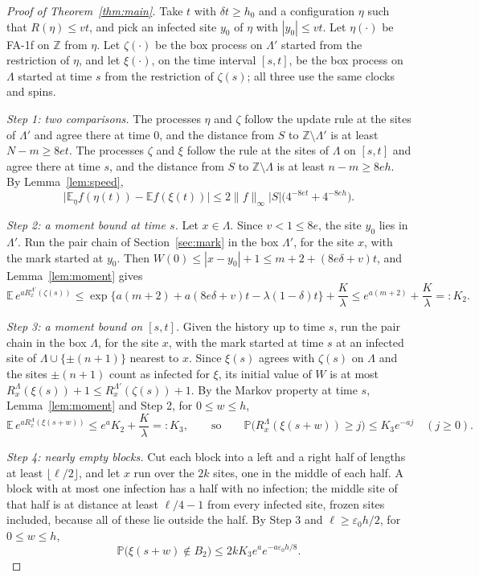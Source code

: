 \documentclass[11pt]{amsart}
\theoremstyle{definition}
\theoremstyle{remark}
\newcommand{\PP}{\mathbb{P}}
\newcommand{\E}{\mathbb{E}}
\newcommand{\Z}{\mathbb{Z}}
\begin{document}
\begin{proof}[Proof of Theorem~\ref{thm:main}]
Take $t$ with $\delta t\ge h_0$ and a configuration $\eta$ such that $R(\eta)\le vt$, and pick an infected site $y_0$
of $\eta$ with $|y_0|\le vt$. Let $\eta(\cdot)$ be FA-1f on $\Z$ from $\eta$. Let $\zeta(\cdot)$ be the box process on
$\Lambda'$ started from the restriction of $\eta$, and let $\xi(\cdot)$, on the time interval $[s,t]$, be the box process
on $\Lambda$ started at time $s$ from the restriction of $\zeta(s)$; all three use the same clocks and spins.

\emph{Step 1: two comparisons.} The processes $\eta$ and $\zeta$ follow the update rule at the sites of $\Lambda'$ and
agree there at time $0$, and the distance from $S$ to $\Z\setminus\Lambda'$ is at least $N-m\ge8et$. The processes
$\zeta$ and $\xi$ follow the rule at the sites of $\Lambda$ on $[s,t]$ and agree there at time $s$, and the distance from
$S$ to $\Z\setminus\Lambda$ is at least $n-m\ge8eh$. By Lemma~\ref{lem:speed},
\begin{equation}\label{eq:step1}
\bigl|\E_\eta f(\eta(t))-\E f(\xi(t))\bigr|\le2\|f\|_\infty|S|\bigl(4^{-8et}+4^{-8eh}\bigr).
\end{equation}

\emph{Step 2: a moment bound at time $s$.} Let $x\in\Lambda$. Since $v<1\le8e$, the site $y_0$ lies in $\Lambda'$. Run the
pair chain of Section~\ref{sec:mark} in the box $\Lambda'$, for the site $x$, with the mark started at $y_0$. Then
$W(0)\le|x-y_0|+1\le m+2+(8e\delta+v)t$, and Lemma~\ref{lem:moment} gives
\[
\E\,e^{aR^{\Lambda'}_x(\zeta(s))}\le\exp\bigl\{a(m+2)+a(8e\delta+v)t-\lambda(1-\delta)t\bigr\}+\frac K\lambda
\le e^{a(m+2)}+\frac K\lambda=:K_2 .
\]

\emph{Step 3: a moment bound on $[s,t]$.} Given the history up to time $s$, run the pair chain in the box $\Lambda$, for
the site $x$, with the mark started at time $s$ at an infected site of $\Lambda\cup\{\pm(n+1)\}$ nearest to $x$. Since
$\xi(s)$ agrees with $\zeta(s)$ on $\Lambda$ and the sites $\pm(n+1)$ count as infected for $\xi$, its initial value of
$W$ is at most $R^\Lambda_x(\xi(s))+1\le R^{\Lambda'}_x(\zeta(s))+1$. By the Markov property at time $s$, Lemma~\ref{lem:moment}
and Step 2, for $0\le w\le h$,
\[
\E\,e^{aR^\Lambda_x(\xi(s+w))}\le e^aK_2+\frac K\lambda=:K_3,\qquad\text{so}\qquad
\PP\bigl(R^\Lambda_x(\xi(s+w))\ge j\bigr)\le K_3e^{-aj}\quad(j\ge0).
\]

\emph{Step 4: nearly empty blocks.} Cut each block into a left and a right half of lengths at least $\lfloor\ell/2\rfloor$,
and let $x$ run over the $2k$ sites, one in the middle of each half. A block with at most one infection has a half with no infection;
the middle site of that half is at distance at least $\ell/4-1$ from every infected site, frozen sites included, because all of
these lie outside the half. By Step 3 and $\ell\ge\varepsilon_0h/2$, for $0\le w\le h$,
\[
\PP\bigl(\xi(s+w)\notin B_2\bigr)\le2kK_3e^{a}e^{-a\varepsilon_0h/8}.
\]


\end{proof}
\end{document}
